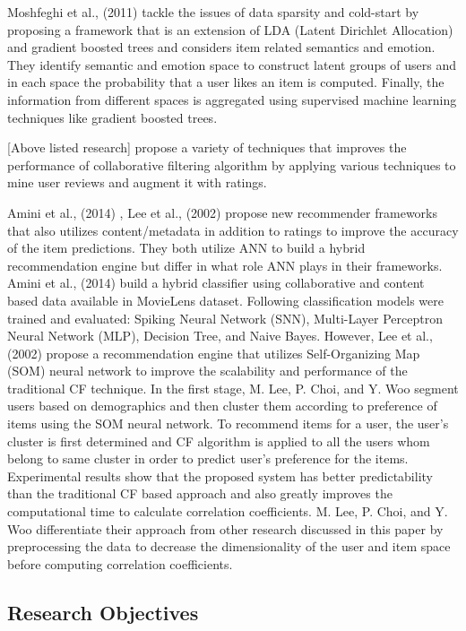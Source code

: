 \documentclass[12pt]{article}
\begin{document}
Moshfeghi et al., (2011) \cite{moshfeghi} tackle the issues of data sparsity and cold-start by proposing a framework that is an extension of LDA (Latent Dirichlet Allocation) and gradient boosted trees and considers item related semantics and emotion. They identify semantic and emotion space to construct latent groups of users and in each space the probability that a user likes an item is computed. Finally, the information from different spaces is aggregated using supervised machine learning techniques like gradient boosted trees. 

[Above listed research] propose a variety of techniques that improves the performance of collaborative filtering algorithm by applying various techniques to mine user reviews and augment it with ratings. 

Amini et al., (2014) \cite{amini}, Lee et al., (2002) \cite{lee} propose new recommender frameworks that also utilizes content/metadata in addition to ratings to improve the accuracy of the item predictions. They both utilize ANN to build a hybrid recommendation engine but differ in what role ANN plays in their frameworks. Amini et al., (2014) \cite{amini} build a hybrid classifier using collaborative and content based data available in MovieLens dataset. Following classification models were trained and evaluated: Spiking Neural Network (SNN), Multi-Layer Perceptron Neural Network (MLP), Decision Tree, and Naive Bayes. However, Lee et al., (2002) \cite{lee} propose a recommendation engine that utilizes Self-Organizing Map (SOM) neural network to improve the scalability and performance of the traditional CF technique. In the first stage, M. Lee, P. Choi, and Y. Woo segment users based on demographics and then cluster them according to preference of items using the SOM neural network. To recommend items for a user, the user's cluster is first determined and CF algorithm is applied to all the users whom belong to same cluster in order to predict user's preference for the items. Experimental results show that the proposed system has better predictability than the traditional CF based approach and also greatly improves the computational time to calculate correlation coefficients. M. Lee, P. Choi, and Y. Woo differentiate their approach from other research discussed in this paper by preprocessing the data to decrease the dimensionality of the user and item space before computing correlation coefficients. 

\subsection{Research Objectives}
\end{document}
